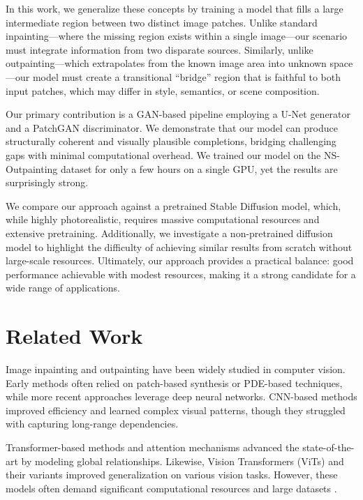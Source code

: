 \documentclass[sigconf]{acmart}
\begin{document}
In this work, we generalize these concepts by training a model that fills a large intermediate region between two distinct image patches. Unlike standard inpainting—where the missing region exists within a single image—our scenario must integrate information from two disparate sources. Similarly, unlike outpainting—which extrapolates from the known image area into unknown space—our model must create a transitional “bridge” region that is faithful to both input patches, which may differ in style, semantics, or scene composition.

Our primary contribution is a GAN-based pipeline employing a U-Net generator and a PatchGAN discriminator. We demonstrate that our model can produce structurally coherent and visually plausible completions, bridging challenging gaps with minimal computational overhead. We trained our model on the NS-Outpainting dataset for only a few hours on a single GPU, yet the results are surprisingly strong.

We compare our approach against a pretrained Stable Diffusion model, which, while highly photorealistic, requires massive computational resources and extensive pretraining. Additionally, we investigate a non-pretrained diffusion model to highlight the difficulty of achieving similar results from scratch without large-scale resources. Ultimately, our approach provides a practical balance: good performance achievable with modest resources, making it a strong candidate for a wide range of applications.

\section{Related Work}
Image inpainting and outpainting have been widely studied in computer vision. Early methods often relied on patch-based synthesis or PDE-based techniques, while more recent approaches leverage deep neural networks. CNN-based methods \cite{Krizhevsky2012,LeCun1998} improved efficiency and learned complex visual patterns, though they struggled with capturing long-range dependencies.

Transformer-based methods and attention mechanisms \cite{Dosovitskiy2020,Liu2021,Jiahui2018} advanced the state-of-the-art by modeling global relationships. Likewise, Vision Transformers (ViTs) and their variants improved generalization on various vision tasks. However, these models often demand significant computational resources and large datasets \cite{Dascoli2021}.
\end{document}
